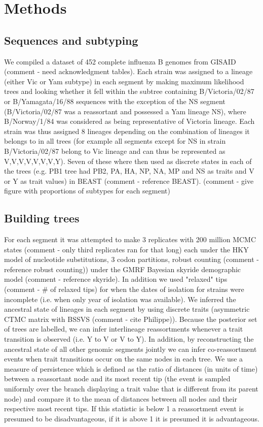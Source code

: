 \documentclass[11pt,oneside,letterpaper]{article}
\begin{document}
\section*{Methods}

\subsection*{Sequences and subtyping}
We compiled a dataset of 452 complete influenza B genomes from GISAID (comment - need acknowledgment tables). 
Each strain was assigned to a lineage (either Vic or Yam subtype) in each segment by making maximum likelihood trees and looking whether it fell within the subtree containing B/Victoria/02/87 or B/Yamagata/16/88 sequences with the exception of the NS segment (B/Victoria/02/87 was a reassortant and possessed a Yam lineage NS), where B/Norway/1/84 was considered as being representative of Victoria lineage.
Each strain was thus assigned 8 lineages depending on the combination of lineages it belongs to in all trees (for example all segments except for NS in strain B/Victoria/02/87 belong to Vic lineage and can thus be represented as V,V,V,V,V,V,V,Y). 
Seven of these where then used as discrete states in each of the trees (e.g. PB1 tree had PB2, PA, HA, NP, NA, MP and NS as traits and V or Y as trait values) in BEAST (comment - reference BEAST). (comment - give figure with proportions of subtypes for each segment)

\subsection*{Building trees}
For each segment it was attempted to make 3 replicates with 200 million MCMC states (comment - only third replicates ran for that long) each under the HKY model of nucleotide substitutions, 3 codon partitions, robust counting (comment - reference robust counting)) under the GMRF Bayesian skyride demographic model (comment - reference skyride).
In addition we used "relaxed" tips (comment - \# of relaxed tips) for when the dates of isolation for strains were incomplete (i.e. when only year of isolation was available).
We inferred the ancestral state of lineages in each segment by using discrete traits (asymmetric CTMC matrix with BSSVS (comment - cite Philippe)). Because the posterior set of trees are labelled, we can infer interlineage reassortments whenever a trait transition is observed (i.e. Y to V or V to Y). 
In addition, by reconstructing the ancestral state of all other genomic segments jointly we can infer co-reassortment events when trait transitions occur on the same nodes in each tree.
We use a measure of persistence which is defined as the ratio of distances (in units of time) between a reassortant node and its most recent tip (the event is sampled uniformly over the branch displaying a trait value that is different from its parent node) and compare it to the mean of distances between all nodes and their respective most recent tips. 
If this statistic is below 1 a reassortment event is presumed to be disadvantageous, if it is above 1 it is presumed it is advantageous.
\end{document}
